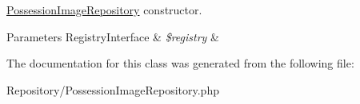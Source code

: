 \mbox{\hyperlink{class_app_1_1_repository_1_1_possession_image_repository}{Possession\+Image\+Repository}} constructor. 
\begin{DoxyParams}[1]{Parameters}
Registry\+Interface & {\em \$registry} & \\
\hline
\end{DoxyParams}


The documentation for this class was generated from the following file\+:\begin{DoxyCompactItemize}
\item 
Repository/Possession\+Image\+Repository.\+php\end{DoxyCompactItemize}
